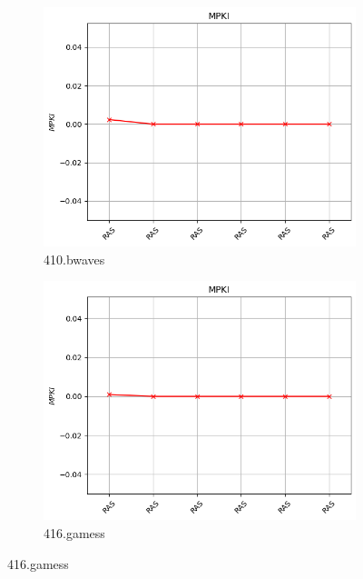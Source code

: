 \documentclass{article}
\begin{document}
\begin{figure}[H]
    \centering
    \ContinuedFloat

    \begin{subfigure}[b]{0.45\textwidth}
        \includegraphics[width=\textwidth]{figures/5_5/410.bwaves.cslab_branch_preds_ref.out.png}
        \caption{410.bwaves}
        \label{fig:plot67}
    \end{subfigure}
    \hfill
    \begin{subfigure}[b]{0.45\textwidth}
        \includegraphics[width=\textwidth]{figures/5_5/416.gamess.cslab_branch_preds_ref.out.png}
        \caption{416.gamess}
        \label{fig:plot68}
    \end{subfigure}


\end{figure}
\end{document}
